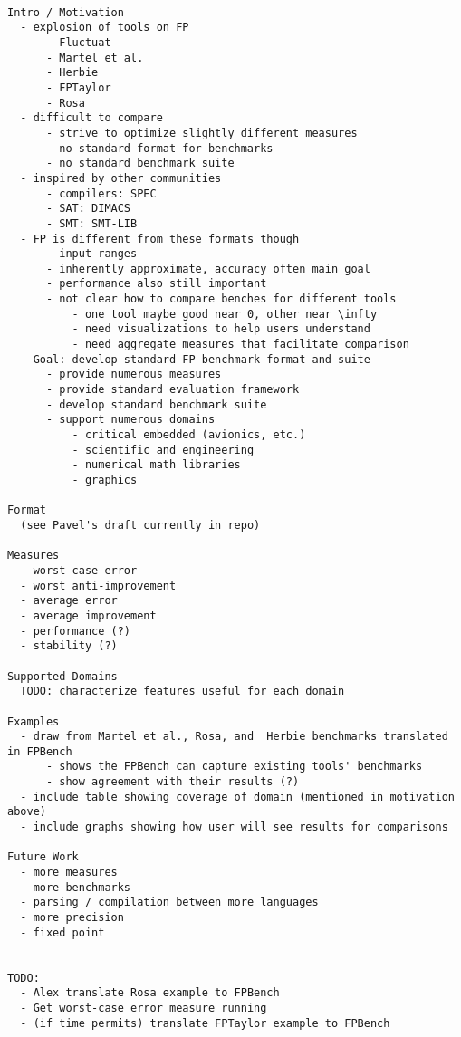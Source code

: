 \begin{verbatim}

Intro / Motivation
  - explosion of tools on FP
      - Fluctuat
      - Martel et al.
      - Herbie
      - FPTaylor
      - Rosa
  - difficult to compare
      - strive to optimize slightly different measures
      - no standard format for benchmarks
      - no standard benchmark suite
  - inspired by other communities
      - compilers: SPEC
      - SAT: DIMACS
      - SMT: SMT-LIB
  - FP is different from these formats though
      - input ranges
      - inherently approximate, accuracy often main goal
      - performance also still important
      - not clear how to compare benches for different tools
          - one tool maybe good near 0, other near \infty
          - need visualizations to help users understand
          - need aggregate measures that facilitate comparison
  - Goal: develop standard FP benchmark format and suite
      - provide numerous measures
      - provide standard evaluation framework
      - develop standard benchmark suite
      - support numerous domains
          - critical embedded (avionics, etc.)
          - scientific and engineering
          - numerical math libraries
          - graphics

Format
  (see Pavel's draft currently in repo)

Measures
  - worst case error
  - worst anti-improvement
  - average error
  - average improvement
  - performance (?)
  - stability (?)

Supported Domains
  TODO: characterize features useful for each domain

Examples
  - draw from Martel et al., Rosa, and  Herbie benchmarks translated in FPBench
      - shows the FPBench can capture existing tools' benchmarks
      - show agreement with their results (?)
  - include table showing coverage of domain (mentioned in motivation above)
  - include graphs showing how user will see results for comparisons

Future Work
  - more measures
  - more benchmarks
  - parsing / compilation between more languages
  - more precision
  - fixed point


TODO:
  - Alex translate Rosa example to FPBench
  - Get worst-case error measure running
  - (if time permits) translate FPTaylor example to FPBench

\end{verbatim}
